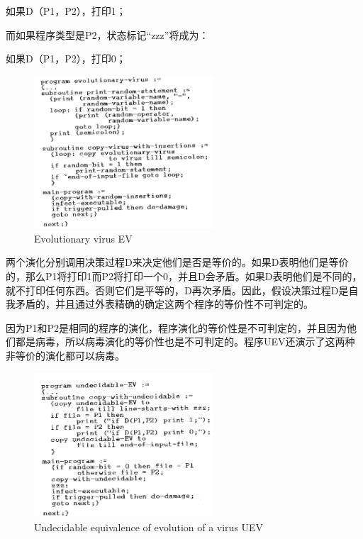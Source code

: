 如果D（P1，P2），打印1；

而如果程序类型是P2，状态标记“zzz”将成为：

如果D（P1，P2），打印0；

\begin{figure}[h!]
    \centering
    \includegraphics[width=0.60\textwidth]{figure/fig7.png}
    \caption{Evolutionary virus EV} 
    \label{fig7}
\end{figure} 

两个演化分别调用决策过程D来决定他们是否是等价的。如果D表明他们是等价的，那么P1将打印1而P2将打印一个0，并且D会矛盾。如果D表明他们是不同的，就不打印任何东西。否则它们是平等的，D再次矛盾。因此，假设决策过程D是自我矛盾的，并且通过外表精确的确定这两个程序的等价性不可判定的。

因为P1和P2是相同的程序的演化，程序演化的等价性是不可判定的，并且因为他们都是病毒，所以病毒演化的等价性也是不可判定的。程序UEV还演示了这两种非等价的演化都可以病毒。

\begin{figure}[h!]
    \centering
    \includegraphics[width=0.60\textwidth]{figure/fig8.png}
    \caption{Undecidable equivalence of evolution of a virus UEV} 
    \label{fig8}
\end{figure} 

